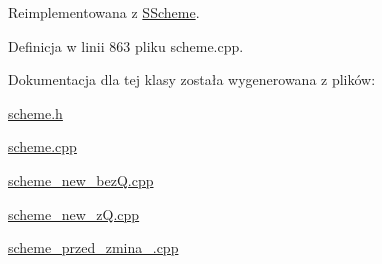 Reimplementowana z \hyperlink{class_s_scheme_ae1e554b35ec2d8a902f6fdb30d95ab20}{S\+Scheme}.



Definicja w linii 863 pliku scheme.\+cpp.



Dokumentacja dla tej klasy została wygenerowana z plików\+:\begin{DoxyCompactItemize}
\item 
\hyperlink{scheme_8h}{scheme.\+h}\item 
\hyperlink{scheme_8cpp}{scheme.\+cpp}\item 
\hyperlink{scheme__new__bez_q_8cpp}{scheme\+\_\+new\+\_\+bez\+Q.\+cpp}\item 
\hyperlink{scheme__new__z_q_8cpp}{scheme\+\_\+new\+\_\+z\+Q.\+cpp}\item 
\hyperlink{scheme__przed__zmina__09092015_8cpp}{scheme\+\_\+przed\+\_\+zmina\+\_.\+cpp}\end{DoxyCompactItemize}
